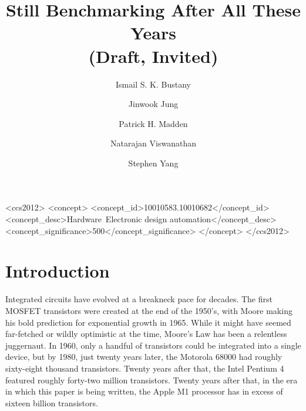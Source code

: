 \documentclass[sigconf]{acmart}
\begin{document}
\title{Still Benchmarking After All These Years\\(Draft, Invited)}
\iffalse
\author{Blind Review}
\else
\author{Ismail S. K. Bustany}
\author{Jinwook Jung}
\author{Patrick H. Madden}
\author{Natarajan Viswanathan}
\author{Stephen Yang}


 
\fi
\begin{abstract}

\end{abstract}

\begin{CCSXML}
<ccs2012>
   <concept>
       <concept_id>10010583.10010682</concept_id>
       <concept_desc>Hardware~Electronic design automation</concept_desc>
       <concept_significance>500</concept_significance>
       </concept>
 </ccs2012>
\end{CCSXML}



%


\maketitle

\section{Introduction}

Integrated circuits have evolved at a breakneck pace for decades.  The
first MOSFET transistors were created at the end of the 1950's, with
Moore\cite{Moore650114} making his bold prediction for exponential
growth in 1965.  While it might have seemed far-fetched or wildly
optimistic at the time, Moore's Law has been a relentless juggernaut.
In 1960, only a handful of transistors could be integrated into a
single device, but by 1980, just twenty years later, the Motorola
68000 had roughly sixty-eight thousand transistors.  Twenty years
after that, the Intel Pentium 4 featured roughly forty-two million
transistors.  Twenty years after that, in the era in which this paper
is being written, the Apple M1 processor has in excess of sixteen
billion transistors.
\end{document}
